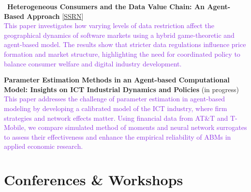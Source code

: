 \documentclass[a4paper,12pt]{article}
\begin{document}
\textbullet\ \textbf{Heterogeneous Consumers and the Data Value Chain: An Agent-Based Approach} [\href{https://papers.ssrn.com/sol3/papers.cfm?abstract_id=5235196}{SSRN}]\\ [1.5ex]
\textcolor{BlueViolet}{This paper investigates how varying levels of data restriction affect the geographical dynamics of software markets using a hybrid game-theoretic and agent-based model. The results show that stricter data regulations influence price formation and market structure, highlighting the need for coordinated policy to balance consumer welfare and digital industry development.}

\textbullet \;\textbf{Parameter Estimation Methods in an Agent-based Computational Model: Insights on ICT Industrial Dynamics and Policies} (in progress)\\ [1.5ex]
\textcolor{BlueViolet}{This paper addresses the challenge of parameter estimation in agent-based modeling by developing a calibrated model of the ICT industry, where firm strategies and network effects matter. Using financial data from AT\&T and T-Mobile, we compare simulated method of moments and neural network surrogates to assess their effectiveness and enhance the empirical reliability of ABMs in applied economic research.}

\section{Conferences \& Workshops}







\end{document}
